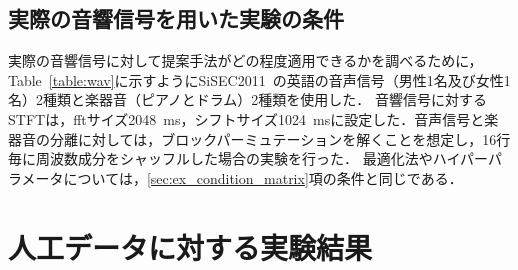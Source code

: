 \subsection{実際の音響信号を用いた実験の条件}
\label{sec:ex_condition_audio}
実際の音響信号に対して提案手法がどの程度適用できるかを調べるために，Table~\ref{table:wav}に示すようにSiSEC2011~\cite{Sisec}の英語の音声信号（男性1名及び女性1名）2種類と楽器音（ピアノとドラム）2種類を使用した．
音響信号に対するSTFTは，fftサイズ2048~ms，シフトサイズ1024~msに設定した．音声信号と楽器音の分離に対しては，ブロックパーミュテーションを解くことを想定し，16行毎に周波数成分をシャッフルした場合の実験を行った．
最適化法やハイパーパラメータについては，\ref{sec:ex_condition_matrix}項の条件と同じである．
\section{人工データに対する実験結果}
\label{sec:ex_res}

